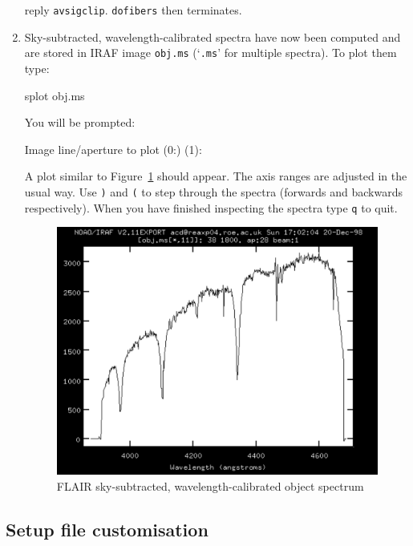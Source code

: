 \documentclass[chapters,twoside,11pt]{starlink}
\begin{document}
\begin{enumerate}
   reply \texttt{avsigclip}.  \texttt{dofibers} then terminates.

  \item Sky-subtracted, wavelength-calibrated spectra have now been
   computed and are stored in IRAF image \texttt{obj.ms} (`\texttt{.ms}' for
   multiple spectra).  To plot them type:

\begin{terminalv}
splot  obj.ms
\end{terminalv}

   You will be prompted:

\begin{terminalv}
Image line/aperture to plot (0:) (1):
\end{terminalv}

   A plot similar to Figure~\ref{FLAIR_OBJECT} should appear.
   The axis ranges are adjusted in the usual way.  Use \texttt{)} and
   \texttt{(} to step through the spectra (forwards and backwards
   respectively).  When you have finished inspecting the spectra type
   \texttt{q} to quit.

  \begin{figure}[htbp]
     \centering
     \includegraphics[totalheight=4in]{sc14_flair_object}
     \caption{FLAIR sky-subtracted, wavelength-calibrated object
      spectrum
     \label{FLAIR_OBJECT} }
  \end{figure}

\end{enumerate}

\subsection{\label{FLAIR_SETUP}Setup file customisation}
\end{document}

